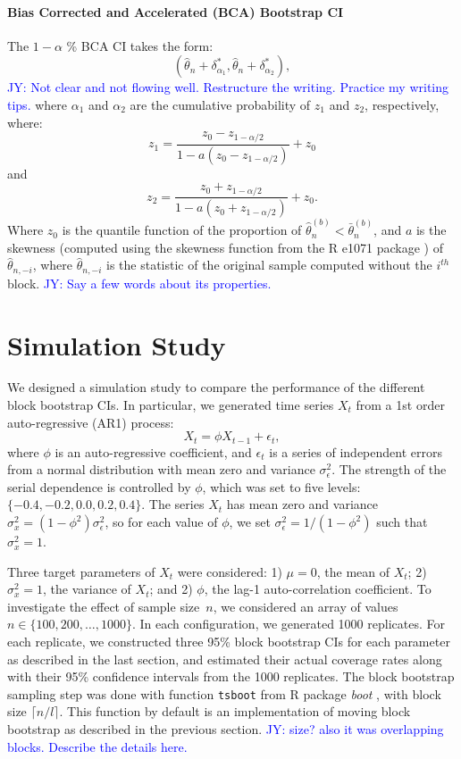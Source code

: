 \documentclass[12pt, letterpaper, titlepage]{article}
\newcommand{\jy}[1]{\textcolor{blue}{JY: #1}}
\begin{document}
\paragraph{Bias Corrected and Accelerated (BCA) Bootstrap CI}
The $1 - \alpha$ \% BCA CI takes the form:
\[
(\hat{\theta}_{n} + \delta^*_{\alpha_1},
\hat{\theta}_{n} + \delta^*_{\alpha_2}),
\]
\jy{Not clear and not flowing well. Restructure the writing. Practice my writing tips.}
where $\alpha_{1}$ and $\alpha_{2}$ are the cumulative probability of $z_{1}$ and
$z_{2}$, respectively, where:
\[z_{1} = \frac{z_{0} - z_{1 - \alpha/2}}{1 - a(z_{0} - z_{1 - \alpha/2})} +
z_{0}\] and
\[z_{2} = \frac{z_{0} + z_{1 - \alpha/2}}{1 - a(z_{0} + z_{1 - \alpha/2})} +
z_{0}.\]
Where $z_0$ is the quantile function of the proportion of
$\hat\theta_n^{(b)} < \bar\theta_n^{(b)}$, and $a$ is the skewness (computed
using
the skewness function from the R e1071 package \citep{e1071}) of
$\hat{\theta}_{n, -i}$, where $\hat{\theta}_{n, -i}$ is the statistic of the
original sample computed without the $i^{th}$ block.
\jy{Say a few words about its properties.}


\section{Simulation Study}
\label{sec:simstudy}

We designed a simulation study to compare the performance of the different
block
bootstrap CIs. In particular, we generated time series $X_t$
from a 1st order auto-regressive (AR1) process:
\[
X_t = \phi X_{t-1} + \epsilon_t,
\]
where $\phi$ is an auto-regressive coefficient, and $\epsilon_t$ is a series of
independent errors from a normal distribution with mean zero and variance
$\sigma_{\epsilon}^2$. The strength of the serial dependence is controlled by
$\phi$, which was set to five levels: $\{-0.4, -0.2, 0.0, 0.2, 0.4\}$.
The series $X_t$ has mean zero and variance
$\sigma_x^2 = (1 - \phi^2) \sigma_{\epsilon}^2$, so for each value of $\phi$,
we
set $\sigma_{\epsilon}^2 = 1 / (1 - \phi^2)$ such that $\sigma_x^2 = 1$.


Three target parameters of $X_t$ were considered:
1) $\mu = 0$, the mean of $X_t$;
2) $\sigma_x^2 = 1$, the variance of $X_t$; and
2) $\phi$, the lag-1 auto-correlation coefficient.
To investigate the effect of sample size~$n$, we considered an array of values
$n \in \{100, 200, \ldots, 1000\}$. In each configuration, we generated 1000
replicates. For each replicate, we constructed three 95\% block bootstrap
CIs for each parameter as described in the last section, and
estimated their actual coverage rates along with their 95\% confidence
intervals from the 1000 replicates. The block bootstrap sampling step was done
with function \texttt{tsboot} from R package \textsl{boot} \citep{boot}, with
block size $\lceil n / l \rceil$. This function by default is an implementation
of moving block bootstrap as described in the previous section.
\jy{size? also it was overlapping blocks. Describe the details here.}
\end{document}
